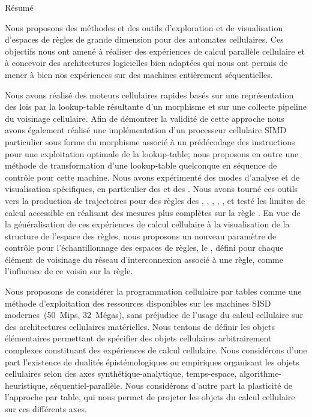 \begin{small}
\begin{center}\begin{Huge}Résumé\end{Huge}\end{center}
\bigskip\bigskip

Nous proposons des méthodes et des outils d'exploration et de
visualisation d'espaces de règles de grande dimension pour des
automates cellulaires. %
Ces objec\-tifs nous ont amené à réaliser des expériences de calcul
parallèle cellulaire et à concevoir des architectures logicielles bien
adaptées qui nous ont permis de mener à bien nos expériences sur des
machines entièrement séquentielles.

Nous avons réalisé des moteurs cellulaires rapides basés sur une
représentation des lois par la lookup-table résultante d'un morphisme
et sur une collecte pipeline du voisinage cellulaire. %
Afin de démontrer la validité de cette approche nous avons également
réalisé une implémentation d'un processeur cellulaire SIMD particulier
sous forme du morphisme associé à un prédécodage des instructions pour
une exploitation optimale de la lookup-table; nous proposons en outre
une méthode de transformation d'une lookup-table quelconque en
séquence de contrôle pour cette machine. %
Nous avons expérimenté des modes d'analyse et de visualisation
spécifiques, en particulier des 
et des . %
Nous avons tourné ces outils vers la production de trajectoires pour
des règles des  , ,
, , , et testé les
limites de calcul accessible en réalisant des mesures plus complètes
sur la règle . %
En vue de la généralisation de ces expériences de calcul cellulaire à
la visualisation de la structure de l'espace des règles, nous
proposons un nouveau paramètre de contrôle pour l'échantillonnage des
espaces de règles, le , défini pour
chaque élément de voisinage du réseau d'interconnexion associé à une
règle, comme l'influence de ce voisin sur la règle.

Nous proposons de considérer la programmation cellulaire par tables
comme une méthode d'exploitation des ressources disponibles sur les
machines SISD modernes~(50~Mips, 32~Mégas), sans préjudice de l'usage
du calcul cellulaire sur des architectures cellulaires matérielles. %
Nous tentons de définir les objets élémentaires permettant de
spécifier des objets cellulaires arbitrairement complexes constituant
des expériences de calcul cellulaire. %
Nous considérons d'une part l'existence de dualités épistémologiques
ou empiriques organisant les objets cellulaires selon des axes
synthétique-analytique, temps-espace, algorithme-heuristique,
séquentiel-parallèle. %
Nous considérons d'autre part la plasticité de l'approche par table,
qui nous permet de projeter les objets du calcul cellulaire
sur ces différents axes.


\end{small}
